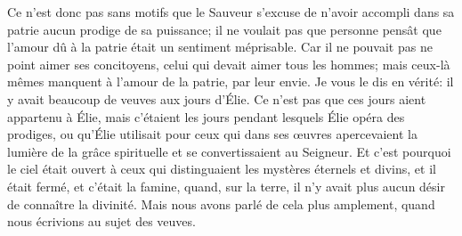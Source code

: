 Ce n’est donc pas sans motifs
		que le Sauveur s’excuse de n’avoir accompli dans sa patrie
	aucun prodige de sa puissance;
	il ne voulait pas que personne pensât que l’amour dû à la patrie
	était un sentiment méprisable.
Car il ne pouvait pas ne point aimer ses concitoyens,
	celui qui devait aimer tous les hommes;
	mais ceux-là mêmes manquent à l’amour de la patrie, par leur envie.
Je vous le dis en vérité: il y avait beaucoup de veuves aux jours d’Élie.
Ce n’est pas que ces jours aient appartenu à Élie,
	mais c’étaient les jours pendant lesquels Élie opéra des prodiges,
	ou qu’Élie utilisait pour ceux
		qui dans ses œuvres apercevaient la lumière de la grâce spirituelle
	et se convertissaient au Seigneur.
Et c’est pourquoi le ciel était ouvert
		à ceux qui distinguaient les mystères éternels et divins,
	et il était fermé, et c’était la famine,
	quand, sur la terre, il n’y avait plus aucun désir de connaître la divinité.
	Mais nous avons parlé de cela plus amplement,
		quand nous écrivions au sujet des veuves.

